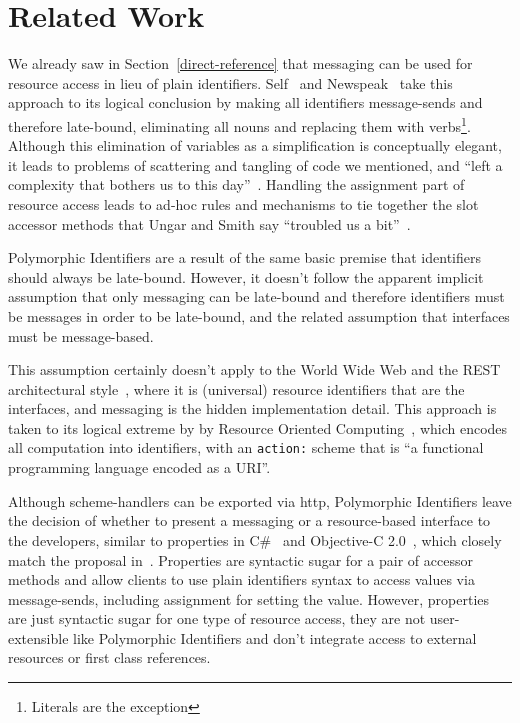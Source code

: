 \documentclass[preprint]{sigplanconf}
\begin{document}
\section{Related Work}
\label{related-work}


We already saw in Section~\ref{direct-reference} that messaging can be used for resource
access in lieu of plain identifiers.  Self~\cite{UngarS87} and Newspeak~\cite{Bracha:2010:MON:1883978.1884007} take this
approach to its logical conclusion by making all identifiers message-sends and therefore late-bound, eliminating
all nouns and replacing them with verbs\footnote{Literals are the exception}.  Although
this elimination of variables as a simplification is conceptually elegant, it leads to problems of scattering and tangling of code we
mentioned, and  ``left a complexity that bothers us to this day''~\cite{Ungar:2007:SEL:1238844.1238853}.
Handling the assignment part of resource access leads to ad-hoc rules and mechanisms to tie together
the slot accessor methods that Ungar and Smith say ``troubled us a bit''~\cite{Ungar:2007:SEL:1238844.1238853}.

Polymorphic Identifiers are a result of the same basic premise that identifiers should always be late-bound.  However,
it doesn't follow the apparent implicit assumption that only messaging can be late-bound and therefore identifiers must
be messages in order to be late-bound, and the related assumption that interfaces must be message-based.

This assumption certainly doesn't apply to the World Wide Web and the REST architectural style~\cite{fielding-rest}, where
it is (universal) resource identifiers that are the interfaces, and messaging is the hidden implementation detail.  This 
approach is taken to its logical extreme by  by Resource Oriented Computing~\cite{roc},
which encodes all computation into identifiers, with an {\tt action:} scheme that is ``a functional programming language encoded as a URI''.

Although scheme-handlers can be exported via http, Polymorphic Identifiers leave the decision of whether to present a messaging
or a resource-based interface to the developers,
similar to properties in C\#~\cite{Archer:2001:IC:516715} and Objective-C 2.0~\cite{Kochan:2009:PO:1538451}, which closely match the proposal in~\cite{Spinellis:2002:MPC:510857.510868}.  Properties are syntactic sugar for a pair of accessor methods and allow clients to use 
 plain identifiers syntax to access values via message-sends, including assignment for setting the value.   However, properties
 are just syntactic sugar for one type of resource access, they are not user-extensible like Polymorphic Identifiers 
 and don't integrate access to external resources or first class references.
\end{document}
